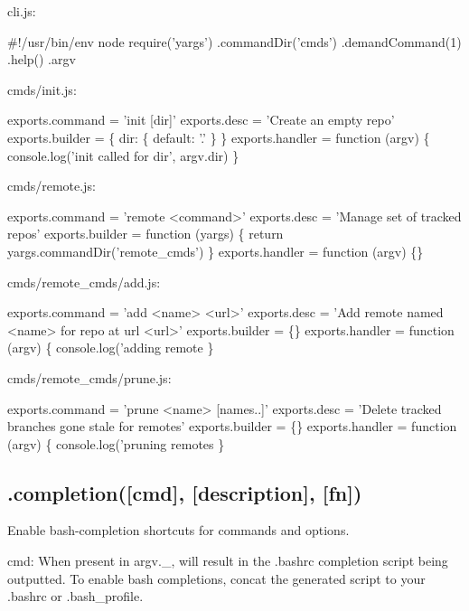 cli.\+js\+:


\begin{DoxyCode}
#!/usr/bin/env node
require('yargs')
  .commandDir('cmds')
  .demandCommand(1)
  .help()
  .argv
\end{DoxyCode}


cmds/init.\+js\+:


\begin{DoxyCode}
exports.command = 'init [dir]'
exports.desc = 'Create an empty repo'
exports.builder = \{
  dir: \{
    default: '.'
  \}
\}
exports.handler = function (argv) \{
  console.log('init called for dir', argv.dir)
\}
\end{DoxyCode}


cmds/remote.\+js\+:


\begin{DoxyCode}
exports.command = 'remote <command>'
exports.desc = 'Manage set of tracked repos'
exports.builder = function (yargs) \{
  return yargs.commandDir('remote\_cmds')
\}
exports.handler = function (argv) \{\}
\end{DoxyCode}


cmds/remote\+\_\+cmds/add.\+js\+:


\begin{DoxyCode}
exports.command = 'add <name> <url>'
exports.desc = 'Add remote named <name> for repo at url <url>'
exports.builder = \{\}
exports.handler = function (argv) \{
  console.log('adding remote %
\}
\end{DoxyCode}


cmds/remote\+\_\+cmds/prune.\+js\+:


\begin{DoxyCode}
exports.command = 'prune <name> [names..]'
exports.desc = 'Delete tracked branches gone stale for remotes'
exports.builder = \{\}
exports.handler = function (argv) \{
  console.log('pruning remotes %
\}
\end{DoxyCode}


\subsection*{.completion(\mbox{[}cmd\mbox{]}, \mbox{[}description\mbox{]}, \mbox{[}fn\mbox{]}) }

Enable bash-\/completion shortcuts for commands and options.

{\ttfamily cmd}\+: When present in {\ttfamily argv.\+\_\+}, will result in the {\ttfamily .bashrc} completion script being outputted. To enable bash completions, concat the generated script to your {\ttfamily .bashrc} or {\ttfamily .bash\+\_\+profile}.

